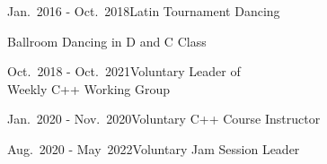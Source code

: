 \documentclass[a4paper,10pt]{cv}
\begin{document}
\begin{multicols}{2}
\begin{cvTimeItem}{Jan.~2016 - Oct.~2018}{Latin Tournament Dancing}
\begin{cvItemize}
          \item Ballroom Dancing in D and C Class
        \end{cvItemize}
      \end{cvTimeItem}
      \begin{cvTimeItem}{Oct.~2018 - Oct.~2021}{Voluntary Leader of \\ Weekly C++ Working Group}
      \end{cvTimeItem}
      \begin{cvTimeItem}{Jan.~2020 - Nov.~2020}{Voluntary C++ Course Instructor}
      \end{cvTimeItem}
      \begin{cvTimeItem}{Aug.~2020 - May~2022}{Voluntary Jam Session Leader}
      \end{cvTimeItem}
    \end{multicols}
\end{document}
